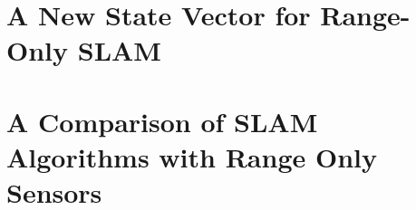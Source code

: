 \begin{comment}
--------------------------------------------------------------------------------
- \cite{ahmad2011newstatevector}
	- A New State Vector for Range-Only SLAM
\end{comment}
\section{A New State Vector for Range-Only SLAM}


\begin{comment}
--------------------------------------------------------------------------------
- \cite{herranz2014comparison}
	- A Comparison of SLAM Algorithms with Range Only Sensors
\end{comment}
\section{A Comparison of SLAM Algorithms with Range Only Sensors}





